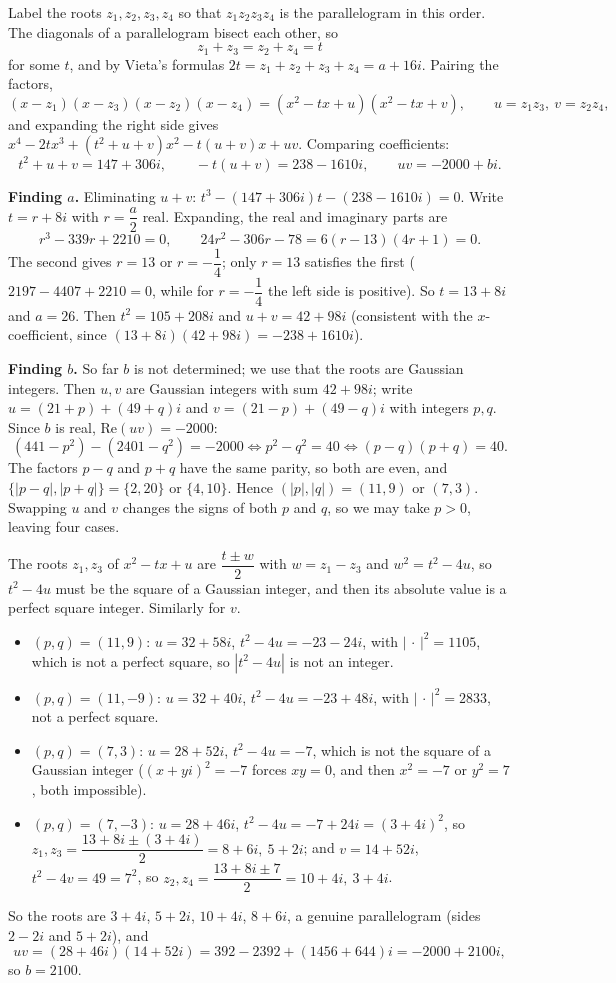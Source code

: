 Label the roots $z_1,z_2,z_3,z_4$ so that $z_1z_2z_3z_4$ is the parallelogram in this order. The diagonals of a parallelogram bisect each other, so
\[z_1+z_3=z_2+z_4=t\]
for some $t$, and by Vieta's formulas $2t=z_1+z_2+z_3+z_4=a+16i$. Pairing the factors,
\[(x-z_1)(x-z_3)(x-z_2)(x-z_4)=\left(x^2-tx+u\right)\left(x^2-tx+v\right),\qquad u=z_1z_3,\ v=z_2z_4,\]
and expanding the right side gives $x^4-2tx^3+(t^2+u+v)x^2-t(u+v)x+uv$. Comparing coefficients:
\[t^2+u+v=147+306i,\qquad -t(u+v)=238-1610i,\qquad uv=-2000+bi.\]

\textbf{Finding $a$.} Eliminating $u+v$: $t^3-(147+306i)t-(238-1610i)=0$. Write $t=r+8i$ with $r=\dfrac a2$ real. Expanding, the real and imaginary parts are
\[r^3-339r+2210=0,\qquad 24r^2-306r-78=6(r-13)(4r+1)=0.\]
The second gives $r=13$ or $r=-\dfrac14$; only $r=13$ satisfies the first ($2197-4407+2210=0$, while for $r=-\dfrac14$ the left side is positive). So $t=13+8i$ and $\boxed{a=26}$. Then $t^2=105+208i$ and $u+v=42+98i$ (consistent with the $x$-coefficient, since $(13+8i)(42+98i)=-238+1610i$).

\textbf{Finding $b$.} So far $b$ is not determined; we use that the roots are Gaussian integers. Then $u,v$ are Gaussian integers with sum $42+98i$; write $u=(21+p)+(49+q)i$ and $v=(21-p)+(49-q)i$ with integers $p,q$. Since $b$ is real, $\mathrm{Re}(uv)=-2000$:
\[(441-p^2)-(2401-q^2)=-2000\iff p^2-q^2=40\iff(p-q)(p+q)=40.\]
The factors $p-q$ and $p+q$ have the same parity, so both are even, and $\{|p-q|,|p+q|\}=\{2,20\}$ or $\{4,10\}$. Hence $(|p|,|q|)=(11,9)$ or $(7,3)$. Swapping $u$ and $v$ changes the signs of both $p$ and $q$, so we may take $p>0$, leaving four cases.

The roots $z_1,z_3$ of $x^2-tx+u$ are $\dfrac{t\pm w}{2}$ with $w=z_1-z_3$ and $w^2=t^2-4u$, so $t^2-4u$ must be the square of a Gaussian integer, and then its absolute value is a perfect square integer. Similarly for $v$.
\begin{itemize}
\item $(p,q)=(11,9)$: $u=32+58i$, $t^2-4u=-23-24i$, with $|\,\cdot\,|^2=1105$, which is not a perfect square, so $|t^2-4u|$ is not an integer.
\item $(p,q)=(11,-9)$: $u=32+40i$, $t^2-4u=-23+48i$, with $|\,\cdot\,|^2=2833$, not a perfect square.
\item $(p,q)=(7,3)$: $u=28+52i$, $t^2-4u=-7$, which is not the square of a Gaussian integer ($(x+yi)^2=-7$ forces $xy=0$, and then $x^2=-7$ or $y^2=7$, both impossible).
\item $(p,q)=(7,-3)$: $u=28+46i$, $t^2-4u=-7+24i=(3+4i)^2$, so $z_1,z_3=\dfrac{13+8i\pm(3+4i)}2=8+6i,\ 5+2i$; and $v=14+52i$, $t^2-4v=49=7^2$, so $z_2,z_4=\dfrac{13+8i\pm7}{2}=10+4i,\ 3+4i$.
\end{itemize}
So the roots are $3+4i$, $5+2i$, $10+4i$, $8+6i$, a genuine parallelogram (sides $2-2i$ and $5+2i$), and
\[uv=(28+46i)(14+52i)=392-2392+(1456+644)i=-2000+2100i,\]
so $\boxed{b=2100}$.

